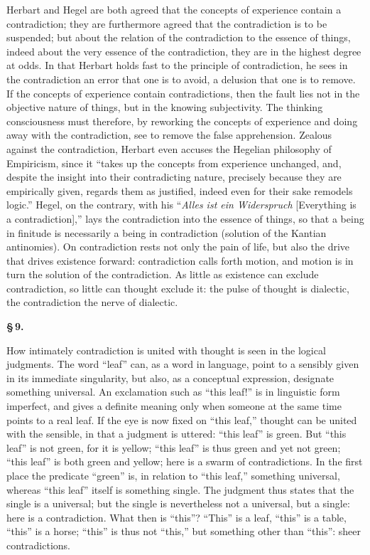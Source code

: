 \documentclass[12pt]{book}
\begin{document}
Herbart and Hegel are both agreed that the concepts of experience contain a
contradiction; they are furthermore agreed that the contradiction is to be
suspended; but about the relation of the contradiction to the essence of things,
indeed about the very essence of the contradiction, they are in the highest degree
at odds. In that Herbart holds fast to the principle of contradiction, he sees in
the contradiction an error that one is to avoid, a delusion that one is to remove.
If the concepts of experience contain contradictions, then the fault lies not in
the objective nature of things, but in the knowing subjectivity. The thinking
consciousness must therefore, by reworking the concepts of experience and doing
away with the contradiction, see to remove the false apprehension. Zealous against
the contradiction, Herbart even accuses the Hegelian philosophy of Empiricism,
since it ``takes up the concepts from experience unchanged, and, despite the
insight into their contradicting nature, precisely because they are empirically
given, regards them as justified, indeed even for their sake remodels logic.''
Hegel, on the contrary, with his ``\textit{Alles ist ein Widerspruch} [Everything
is a contradiction],'' lays the contradiction into the essence of things, so that
a being in finitude is necessarily a being in contradiction (solution of the
Kantian antinomies). On contradiction rests not only the pain of life, but also
the drive that drives existence forward: contradiction calls forth motion, and
motion is in turn the solution of the contradiction. As little as existence can
exclude contradiction, so little can thought exclude it: the pulse of thought is
dialectic, the contradiction the nerve of dialectic.
\begin{center}{\bfseries \S\,9.}\end{center}

How intimately contradiction is united with thought is seen in the logical
judgments. The word ``leaf'' can, as a word in language, point to a sensibly given
in its immediate singularity, but also, as a conceptual expression, designate
something universal. An exclamation such as ``this leaf!'' is in linguistic form
imperfect, and gives a definite meaning only when someone at the same time points
to a real leaf. If the eye is now fixed on ``this leaf,'' thought can be united
with the sensible, in that a judgment is uttered: ``this leaf'' is green. But
``this leaf'' is not green, for it is yellow; ``this leaf'' is thus green and yet
not green; ``this leaf'' is both green and yellow; here is a swarm of
contradictions. In the first place the predicate ``green'' is, in relation to
``this leaf,'' something universal, whereas ``this leaf'' itself is something
single. The judgment thus states that the single is a universal; but the single is
nevertheless not a universal, but a single: here is a contradiction. What then is
``this''? ``This'' is a leaf, ``this'' is a table, ``this'' is a horse; ``this''
is thus not ``this,'' but something other than ``this'': sheer contradictions.
\end{document}
